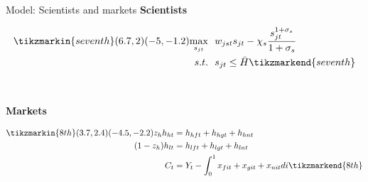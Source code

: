 \documentclass[11pt,aspectratio=169]{beamer}
\begin{document}
\begin{frame}{Model: Scientists and markets}
\textbf{Scientists}\\
\vspace{2mm}
\begin{minipage}[t!]{1\textwidth}
	\begin{align*}
	\tikzmarkin{seventh}(6.7,2)(-5,-1.2)
\underset{s_{jt}}{\max}\ \ & w_{jst}s_{jt}-\chi_s \frac{s_{jt}^{1+\sigma_s}}{1+\sigma_s}\\
s.t. \ \ & s_{jt}\leq \bar{H}	\tikzmarkend{seventh}
	\end{align*}
\end{minipage}
\\
\pause

\vspace{9mm}
\textbf{Markets}\\ \vspace{1mm}
\begin{minipage}[t!]{1\textwidth}
	\begin{align*}
	\tikzmarkin{8th}(3.7,2.4)(-4.5,-2.2)
z_h h_{ht}&=h_{hft}+h_{hgt}+h_{hnt}\\
(1-z_h) h_{lt}&=h_{lft}+h_{lgt}+h_{lnt}\\
C_t&=Y_t-\int_{0}^{1}x_{fit}+x_{git}+x_{nit}di
	\tikzmarkend{8th}
	\end{align*}
\end{minipage}
\end{frame}
\end{document}
